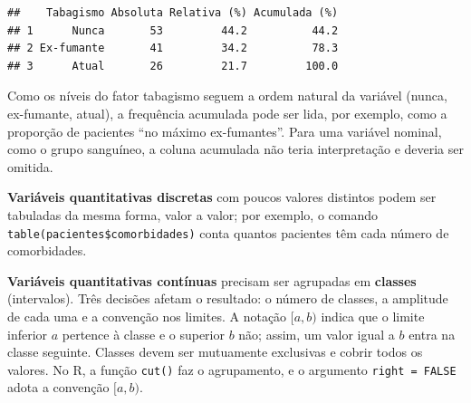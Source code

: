 \documentclass[
]{book}
\newenvironment{Shaded}{\begin{snugshade}}{\end{snugshade}}
\newcommand{\AttributeTok}[1]{\textcolor[rgb]{0.13,0.29,0.53}{#1}}
\newcommand{\ConstantTok}[1]{\textcolor[rgb]{0.56,0.35,0.01}{#1}}
\newcommand{\DecValTok}[1]{\textcolor[rgb]{0.00,0.00,0.81}{#1}}
\newcommand{\FloatTok}[1]{\textcolor[rgb]{0.00,0.00,0.81}{#1}}
\newcommand{\FunctionTok}[1]{\textcolor[rgb]{0.13,0.29,0.53}{\textbf{#1}}}
\newcommand{\NormalTok}[1]{#1}
\newcommand{\OtherTok}[1]{\textcolor[rgb]{0.56,0.35,0.01}{#1}}
\newcommand{\SpecialCharTok}[1]{\textcolor[rgb]{0.81,0.36,0.00}{\textbf{#1}}}
\newcommand{\StringTok}[1]{\textcolor[rgb]{0.31,0.60,0.02}{#1}}
\begin{document}
\begin{verbatim}
##    Tabagismo Absoluta Relativa (%) Acumulada (%)
## 1      Nunca       53         44.2          44.2
## 2 Ex-fumante       41         34.2          78.3
## 3      Atual       26         21.7         100.0
\end{verbatim}

Como os níveis do fator tabagismo seguem a ordem natural da variável (nunca, ex-fumante, atual), a frequência acumulada pode ser lida, por exemplo, como a proporção de pacientes ``no máximo ex-fumantes''. Para uma variável nominal, como o grupo sanguíneo, a coluna acumulada não teria interpretação e deveria ser omitida.

\textbf{Variáveis quantitativas discretas} com poucos valores distintos podem ser tabuladas da mesma forma, valor a valor; por exemplo, o comando \texttt{table(pacientes\$comorbidades)} conta quantos pacientes têm cada número de comorbidades.

\textbf{Variáveis quantitativas contínuas} precisam ser agrupadas em \textbf{classes} (intervalos). Três decisões afetam o resultado: o número de classes, a amplitude de cada uma e a convenção nos limites. A notação \([a, b)\) indica que o limite inferior \(a\) pertence à classe e o superior \(b\) não; assim, um valor igual a \(b\) entra na classe seguinte. Classes devem ser mutuamente exclusivas e cobrir todos os valores. No R, a função \texttt{cut()} faz o agrupamento, e o argumento \texttt{right\ =\ FALSE} adota a convenção \([a, b)\).

\begin{Shaded}
\end{Shaded}
\end{document}
